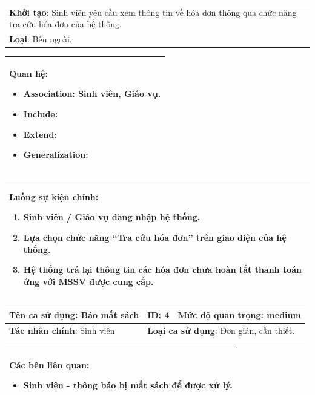 \documentclass[12pt]{report}
\begin{document}
\begin{center}
\begin{tabular}{| m{15.9cm} |}
    \hline
    \textbf{Khởi tạo}: Sinh viên yêu cầu xem thông tin về hóa đơn thông qua chức năng tra cứu hóa đơn của hệ thống. \\
    \textbf{Loại}: Bên ngoài.  \\
    \hline
\end{tabular}

\begin{tabular}{| m{15.9cm} |}
    \hline
    \textbf{Quan hệ}:
    \begin{itemize}
        \item Association: Sinh viên, Giáo vụ. 
        \item Include: 
        \item Extend: 
        \item Generalization: 
    \end{itemize} \\
    \hline
\end{tabular}

\begin{tabular}{| m{15.9cm} |}
    \hline
    \textbf{Luồng sự kiện chính}:
    \begin{enumerate}
        \item Sinh viên / Giáo vụ đăng nhập hệ thống. 
        \item Lựa chọn chức năng ``Tra cứu hóa đơn'' trên giao diện của hệ thống. 
        \item Hệ thống trả lại thông tin các hóa đơn chưa hoàn tất thanh toán ứng với MSSV được cung cấp. 
    \end{enumerate} \\
    \hline
\end{tabular}

\newpage
\begin{tabular}{| m{6cm} | m{3cm} | m{6cm} |}
    \hline
    \textbf{Tên ca sử dụng}: Báo mất sách & \textbf{ID}: 4 & \textbf{Mức độ quan trọng}: medium \\
    \hline
    \textbf{Tác nhân chính}: Sinh viên & \multicolumn{2}{|l|}{\textbf{Loại ca sử dụng}: Đơn giản, cần thiết.} \\
    \hline
\end{tabular}
\begin{tabular}{| m{15.9cm} |}
    \hline
        \textbf{Các bên liên quan:} 
        \begin{itemize}
            \item Sinh viên - thông báo bị mất sách để được xử lý. 
        \end{itemize} \\
    \hline
\end{tabular}


\end{center}
\end{document}
